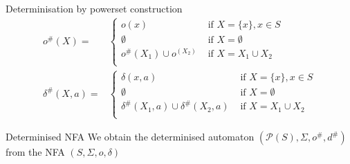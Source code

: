 \documentclass[compress]{beamer}
\begin{document}
\begin{frame}{Determinisation by powerset construction}
      \begin{align}
        o^\#(X) = &\begin{cases}
            o(x)                    &\text{ if } X = \{x\}, x \in S\\
            \emptyset               &\text{ if } X = \emptyset\\
            o^\#(X_1) \cup o^(X_2)  &\text{ if } X = X_1 \cup X_2\\
          \end{cases}\\
        \delta^\#(X, a) = &\begin{cases}
            \delta(x, a)                              &\text{ if } X =\{x\}, x \in S\\
            \emptyset                                 &\text{ if } X = \emptyset\\
            \delta^\#(X_1, a) \cup \delta^\#(X_2, a)  &\text{ if } X = X_1 \cup X_2\\
          \end{cases}
      \end{align}

  \begin{block}{Determinised NFA}
    We obtain the determinised automaton $(\mathcal{P}(S), \Sigma, o^{\#}, d^{\#})$
      from the NFA $(S, \Sigma, o, \delta)$
  \end{block}
\end{frame}
\end{document}

